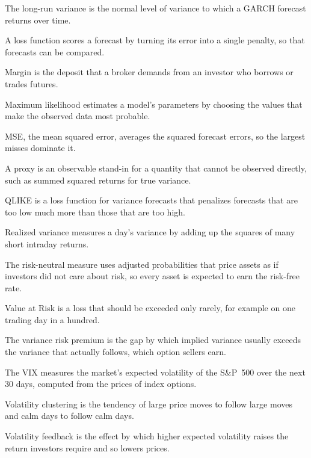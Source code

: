\begin{keyterms}
\begin{description}[leftmargin=0pt, itemsep=0pt, parsep=0pt, topsep=0pt, font=\normalfont\bfseries\color{FEMaroon}]
  \item[Long-run variance.] The long-run variance is the normal level of variance to which a GARCH forecast returns over time.
  \item[Loss function.] A loss function scores a forecast by turning its error into a single penalty, so that forecasts can be compared.
  \item[Margin.] Margin is the deposit that a broker demands from an investor who borrows or trades futures.
  \item[Maximum likelihood.] Maximum likelihood estimates a model's parameters by choosing the values that make the observed data most probable.
  \item[MSE.] MSE, the mean squared error, averages the squared forecast errors, so the largest misses dominate it.
  \item[Proxy.] A proxy is an observable stand-in for a quantity that cannot be observed directly, such as summed squared returns for true variance.
  \item[QLIKE.] QLIKE is a loss function for variance forecasts that penalizes forecasts that are too low much more than those that are too high.
  \item[Realized variance.] Realized variance measures a day's variance by adding up the squares of many short intraday returns.
  \item[Risk-neutral measure.] The risk-neutral measure uses adjusted probabilities that price assets as if investors did not care about risk, so every asset is expected to earn the risk-free rate.
  \item[Value at Risk (VaR).] Value at Risk is a loss that should be exceeded only rarely, for example on one trading day in a hundred.
  \item[Variance risk premium.] The variance risk premium is the gap by which implied variance usually exceeds the variance that actually follows, which option sellers earn.
  \item[VIX.] The VIX measures the market's expected volatility of the S\&P~500 over the next 30 days, computed from the prices of index options.
  \item[Volatility clustering.] Volatility clustering is the tendency of large price moves to follow large moves and calm days to follow calm days.
  \item[Volatility feedback.] Volatility feedback is the effect by which higher expected volatility raises the return investors require and so lowers prices.
\end{description}
\end{keyterms}

